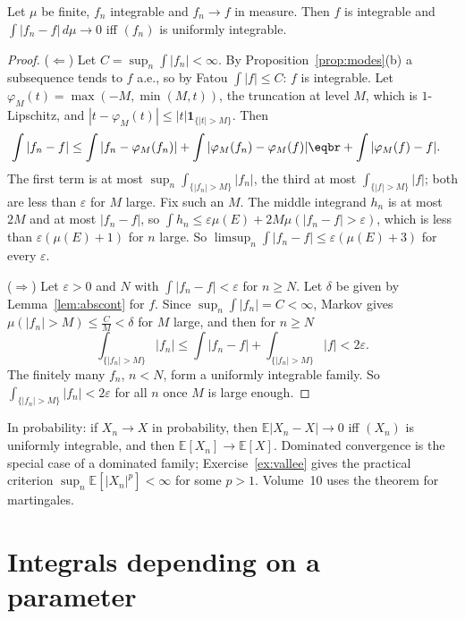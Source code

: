 \begin{theorem}\label{thm:vitali7}
Let $\mu$ be finite, $f_n$ integrable and $f_n\to f$ in measure. Then $f$ is integrable and $\int|f_n-f|\,d\mu\to0$ iff $(f_n)$ is uniformly integrable.
\end{theorem}
\begin{proof}
($\Leftarrow$) Let $C=\sup_n\int|f_n|<\infty$. By Proposition~\ref{prop:modes}(b) a subsequence tends to $f$ a.e., so by Fatou $\int|f|\le C$: $f$ is integrable. Let $\varphi_M(t)=\max(-M,\min(M,t))$,
the truncation at level $M$, which is $1$-Lipschitz, and $|t-\varphi_M(t)|\le|t|\mathbf 1_{\{|t|>M\}}$. Then
\[\begin{aligned}\int|f_n-f|&\le\int|f_n-\varphi_M(f_n)|+\int|\varphi_M(f_n)-\varphi_M(f)|\eqbr+\int|\varphi_M(f)-f|.\end{aligned}\]
The first term is at most $\sup_n\int_{\{|f_n|>M\}}|f_n|$, the third at most $\int_{\{|f|>M\}}|f|$; both are less than $\varepsilon$ for $M$ large. Fix such an $M$. The middle integrand $h_n$ is at most
$2M$ and at most $|f_n-f|$, so $\int h_n\le\varepsilon\mu(E)+2M\mu(|f_n-f|>\varepsilon)$, which is less than $\varepsilon(\mu(E)+1)$ for $n$ large. So $\limsup_n\int|f_n-f|\le\varepsilon(\mu(E)+3)$ for every $\varepsilon$.

($\Rightarrow$) Let $\varepsilon>0$ and $N$ with $\int|f_n-f|<\varepsilon$ for $n\ge N$. Let $\delta$ be given by Lemma~\ref{lem:abscont} for $f$. Since $\sup_n\int|f_n|=C<\infty$, Markov gives $\mu(|f_n|>M)\le\frac CM<\delta$ for
$M$ large, and then for $n\ge N$
\[\int_{\{|f_n|>M\}}|f_n|\le\int|f_n-f|+\int_{\{|f_n|>M\}}|f|<2\varepsilon.\]
The finitely many $f_n$, $n<N$, form a uniformly integrable family. So $\int_{\{|f_n|>M\}}|f_n|<2\varepsilon$ for all $n$ once $M$ is large enough.
\end{proof}

In probability: if $X_n\to X$ in probability, then $\mathbb E|X_n-X|\to0$ iff $(X_n)$ is uniformly integrable, and then $\mathbb E[X_n]\to\mathbb E[X]$. Dominated convergence is the special
case of a dominated family; Exercise~\ref{ex:vallee} gives the practical criterion $\sup_n\mathbb E[|X_n|^p]<\infty$ for some $p>1$. Volume~10 uses the theorem for martingales.

\section{Integrals depending on a parameter}

